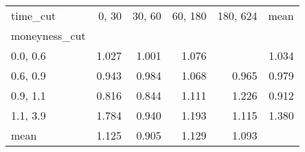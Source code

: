 \begin{tabular}{lrrrrr}
\toprule
time\_cut &  0, 30 &  30, 60 &  60, 180 &  180, 624 &  mean \\
moneyness\_cut &          &           &            &             &       \\
\midrule
0.0, 0.6    &    1.027 &     1.001 &      1.076 &             & 1.034 \\
0.6, 0.9    &    0.943 &     0.984 &      1.068 &       0.965 & 0.979 \\
0.9, 1.1    &    0.816 &     0.844 &      1.111 &       1.226 & 0.912 \\
1.1, 3.9    &    1.784 &     0.940 &      1.193 &       1.115 & 1.380 \\
mean          &    1.125 &     0.905 &      1.129 &       1.093 &       \\
\bottomrule
\end{tabular}
